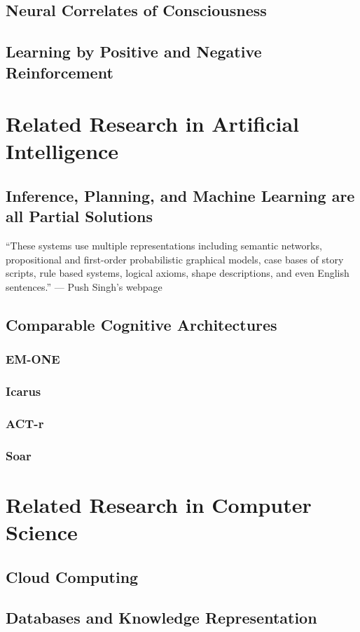 \section{Neural Correlates of Consciousness}

\section{Learning by Positive and Negative Reinforcement}


\chapter{Related Research in Artificial Intelligence}

\section{Inference, Planning, and Machine Learning are all Partial Solutions}

``These systems use multiple representations including semantic networks, propositional and first-order probabilistic graphical models, case bases of story scripts, rule based systems, logical axioms, shape descriptions, and even English sentences.'' --- Push Singh's webpage

\section{Comparable Cognitive Architectures}

\subsection{EM-ONE}
\subsection{Icarus}
\subsection{ACT-r}
\subsection{Soar}

\chapter{Related Research in Computer Science}

\section{Cloud Computing}

\section{Databases and Knowledge Representation}

